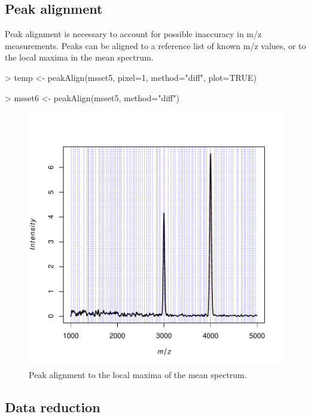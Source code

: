\documentclass[a4paper]{article}
\begin{document}
\subsection{Peak alignment}

Peak alignment is necessary to account for possible inaccuracy in m/z measurements. Peaks can be aligned to a reference list of known m/z values, or to the local maxima in the mean spectrum.
\begin{Schunk}
\begin{Sinput}
> temp <- peakAlign(msset5, pixel=1, method="diff", plot=TRUE)
\end{Sinput}
\end{Schunk}
\begin{Schunk}
\begin{Sinput}
> msset6 <- peakAlign(msset5, method="diff")
\end{Sinput}
\end{Schunk}
\begin{figure}
\begin{center}
\includegraphics{Cardinal-demo-055}
\caption{\small Peak alignment to the local maxima of the mean spectrum.}
\end{center}
\end{figure}

\subsection{Data reduction}
\end{document}
